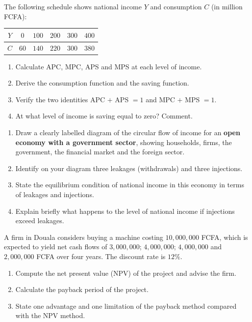 \documentclass[11pt]{article}
\newcounter{popsec}
\newcounter{popsub}
\newcommand{\courssub}[1]{%
  \stepcounter{popsub}%
  \par\vspace{9pt}\noindent{\popxbold\fontsize{11.5}{13}\selectfont\color{popink}{\color{poporange}\thepopsec.\thepopsub}\hspace{6pt}#1}\par\nopagebreak\vspace{4pt}
}
\begin{document}
\courssub{I practise}

\begin{exercice}
The following schedule shows national income $Y$ and consumption $C$ (in million FCFA):
\begin{center}
\begin{tabular}{|c|c|c|c|c|c|}
\hline
$Y$ & $0$ & $100$ & $200$ & $300$ & $400$ \\
\hline
$C$ & $60$ & $140$ & $220$ & $300$ & $380$ \\
\hline
\end{tabular}
\end{center}
\begin{enumerate}
\item Calculate APC, MPC, APS and MPS at each level of income.
\item Derive the consumption function and the saving function.
\item Verify the two identities APC $+$ APS $= 1$ and MPC $+$ MPS $= 1$.
\item At what level of income is saving equal to zero? Comment.
\end{enumerate}
\end{exercice}

\begin{exercice}
\begin{enumerate}
\item Draw a clearly labelled diagram of the circular flow of income for an \textbf{open economy with a government sector}, showing households, firms, the government, the financial market and the foreign sector.
\item Identify on your diagram three leakages (withdrawals) and three injections.
\item State the equilibrium condition of national income in this economy in terms of leakages and injections.
\item Explain briefly what happens to the level of national income if injections exceed leakages.
\end{enumerate}
\end{exercice}

\begin{exercice}
A firm in Douala considers buying a machine costing $10{,}000{,}000$ FCFA, which is expected to yield net cash flows of $3{,}000{,}000$; $4{,}000{,}000$; $4{,}000{,}000$ and $2{,}000{,}000$ FCFA over four years. The discount rate is $12\%$.
\begin{enumerate}
\item Compute the net present value (NPV) of the project and advise the firm.
\item Calculate the payback period of the project.
\item State one advantage and one limitation of the payback method compared with the NPV method.
\end{enumerate}
\end{exercice}
\end{document}
